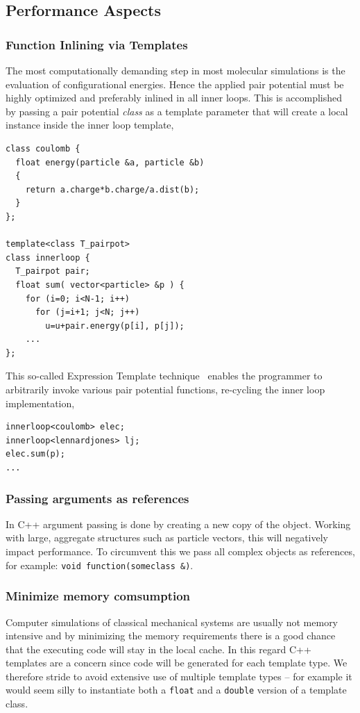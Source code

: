\documentclass[10pt]{bmc_article}
\newenvironment{bmcformat}{\fussy\setboolean{publ}{true}}{\fussy}
\begin{document}
\begin{bmcformat}
\subsection*{Performance Aspects}
\subsubsection*{Function Inlining via Templates}
The most computationally demanding step in most molecular simulations is the evaluation of configurational energies.
Hence the applied pair potential must be highly optimized and preferably inlined in all inner loops.
This is accomplished by passing a pair potential \emph{class} as a template parameter that will create a local instance inside the inner loop template,
\begin{verbatim}
class coulomb {
  float energy(particle &a, particle &b)
  {
    return a.charge*b.charge/a.dist(b);
  }
};

template<class T_pairpot>
class innerloop {
  T_pairpot pair;
  float sum( vector<particle> &p ) {
    for (i=0; i<N-1; i++)
      for (j=i+1; j<N; j++) 
        u=u+pair.energy(p[i], p[j]);
    ...
};
\end{verbatim}
This so-called Expression Template technique~\cite{veldhuizen:95} enables the programmer to arbitrarily invoke various pair potential functions, re-cycling the inner loop implementation,
\begin{verbatim}
innerloop<coulomb> elec;
innerloop<lennardjones> lj;
elec.sum(p);
...
\end{verbatim}

\subsubsection*{Passing arguments as references}
In C++ argument passing is done by creating a new copy of the object. Working with large, aggregate structures such as particle vectors, this will negatively impact performance. To circumvent this we pass all complex objects as references, for example: \verb"void function(someclass &)".

\subsubsection*{Minimize memory comsumption}
Computer simulations of classical mechanical systems are usually not memory intensive and by minimizing the memory requirements there is a good chance that the executing code will stay in the local cache. In this regard C++ templates are a concern since code will be generated for each template type. We therefore stride to avoid extensive use of multiple template types -- for example it would seem silly to instantiate both a \verb"float" and a \verb"double" version of a template class.


\end{bmcformat}
\end{document}
